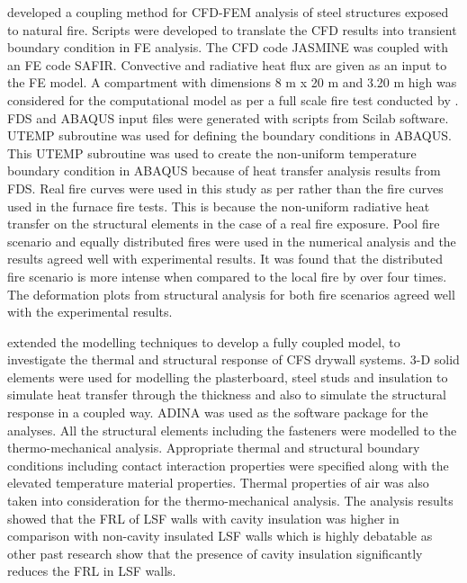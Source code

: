\citet{Malendowski2017} developed a coupling method for CFD-FEM analysis of steel structures exposed to natural fire. Scripts were developed to translate the CFD results into transient boundary condition in FE analysis. The CFD code JASMINE was coupled with an FE code SAFIR. Convective and radiative heat flux are given as an input to the FE model. A compartment with dimensions 8 m x 20 m and 3.20 m high was considered for the computational model as per a full scale fire test conducted by \citet{Pyl2012}. FDS and ABAQUS input files were generated with scripts from Scilab software. UTEMP subroutine was used for defining the boundary conditions in ABAQUS. This UTEMP subroutine was used to create the non-uniform temperature boundary condition in ABAQUS because of heat transfer analysis results from FDS. Real fire curves were used in this study as per \citet{Pyl2012} rather than the fire curves used in the furnace fire tests. This is because the non-uniform radiative heat transfer on the structural elements in the case of a real fire exposure. Pool fire scenario and equally distributed fires were used in the numerical analysis and the results agreed well with experimental results. It was found that the distributed fire scenario is more intense when compared to the local fire by over four times. The deformation plots from structural analysis for both fire scenarios agreed well with the experimental results. 

\citet{Thanasoulas2018} extended the modelling techniques to develop a fully coupled model, to investigate the thermal and structural response of CFS drywall systems. 3-D solid elements were used for modelling the plasterboard, steel studs and insulation to simulate heat transfer through the thickness and also to simulate the structural response in a coupled way. ADINA was used as the software package for the analyses. All the structural elements including the fasteners were modelled to the thermo-mechanical analysis. Appropriate thermal and structural boundary conditions including contact interaction properties were specified along with the elevated temperature material properties. Thermal properties of air was also taken into consideration for the thermo-mechanical analysis. The analysis results showed that the FRL of LSF walls with cavity insulation was higher in comparison with non-cavity insulated LSF walls which is highly debatable as other past research show that the presence of cavity insulation significantly reduces the FRL in LSF walls. 

